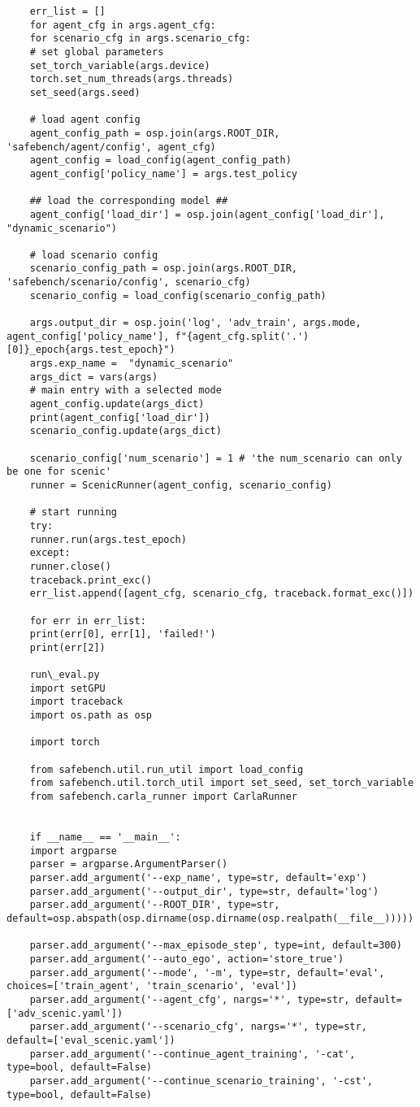 \begin{lstlisting}
	err_list = []
	for agent_cfg in args.agent_cfg:
	for scenario_cfg in args.scenario_cfg:
	# set global parameters
	set_torch_variable(args.device)
	torch.set_num_threads(args.threads)
	set_seed(args.seed)
	
	# load agent config
	agent_config_path = osp.join(args.ROOT_DIR, 'safebench/agent/config', agent_cfg)
	agent_config = load_config(agent_config_path)
	agent_config['policy_name'] = args.test_policy
	
	## load the corresponding model ##
	agent_config['load_dir'] = osp.join(agent_config['load_dir'], "dynamic_scenario")
	
	# load scenario config
	scenario_config_path = osp.join(args.ROOT_DIR, 'safebench/scenario/config', scenario_cfg)
	scenario_config = load_config(scenario_config_path)
	
	args.output_dir = osp.join('log', 'adv_train', args.mode, agent_config['policy_name'], f"{agent_cfg.split('.')[0]}_epoch{args.test_epoch}")
	args.exp_name =  "dynamic_scenario"
	args_dict = vars(args)
	# main entry with a selected mode
	agent_config.update(args_dict)
	print(agent_config['load_dir'])
	scenario_config.update(args_dict)
	
	scenario_config['num_scenario'] = 1 # 'the num_scenario can only be one for scenic'
	runner = ScenicRunner(agent_config, scenario_config)
	
	# start running
	try:
	runner.run(args.test_epoch)
	except:
	runner.close()
	traceback.print_exc()
	err_list.append([agent_cfg, scenario_cfg, traceback.format_exc()])
	
	for err in err_list:
	print(err[0], err[1], 'failed!')
	print(err[2])
	
	run\_eval.py
	import setGPU
	import traceback
	import os.path as osp
	
	import torch 
	
	from safebench.util.run_util import load_config
	from safebench.util.torch_util import set_seed, set_torch_variable
	from safebench.carla_runner import CarlaRunner
	
	
	if __name__ == '__main__':
	import argparse
	parser = argparse.ArgumentParser()
	parser.add_argument('--exp_name', type=str, default='exp')
	parser.add_argument('--output_dir', type=str, default='log')
	parser.add_argument('--ROOT_DIR', type=str, default=osp.abspath(osp.dirname(osp.dirname(osp.realpath(__file__)))))
	
	parser.add_argument('--max_episode_step', type=int, default=300)
	parser.add_argument('--auto_ego', action='store_true')
	parser.add_argument('--mode', '-m', type=str, default='eval', choices=['train_agent', 'train_scenario', 'eval'])
	parser.add_argument('--agent_cfg', nargs='*', type=str, default=['adv_scenic.yaml'])
	parser.add_argument('--scenario_cfg', nargs='*', type=str, default=['eval_scenic.yaml'])
	parser.add_argument('--continue_agent_training', '-cat', type=bool, default=False)
	parser.add_argument('--continue_scenario_training', '-cst', type=bool, default=False)
	

\end{lstlisting}
